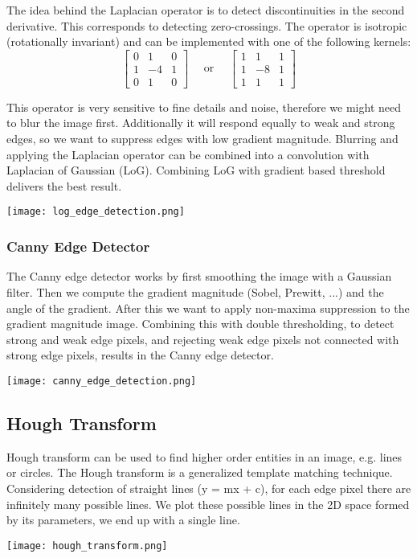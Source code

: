 The idea behind the Laplacian operator is to detect discontinuities in the second derivative. This corresponds to detecting zero-crossings. The operator is isotropic (rotationally invariant) and can be implemented with one of the following kernels:
$$
\begin{bmatrix}
    0 & 1 & 0\\
    1 & -4 & 1\\
    0 & 1 & 0
\end{bmatrix}
\quad
\text{ or }
\quad
\begin{bmatrix}
    1 & 1 & 1\\
    1 & -8 & 1\\
    1 & 1 & 1
\end{bmatrix}
$$

This operator is very sensitive to fine details and noise, therefore we might need to blur the image first. Additionally it will respond equally to weak and strong edges, so we want to suppress edges with low gradient magnitude. Blurring and applying the Laplacian operator can be combined into a convolution with Laplacian of Gaussian (LoG). Combining LoG with gradient based threshold delivers the best result.
\begin{center}
	\texttt{[image: log\_edge\_detection.png]}
\end{center}

\subsubsection{Canny Edge Detector}

The Canny edge detector works by first smoothing the image with a Gaussian filter. Then we compute the gradient magnitude (Sobel, Prewitt, ...) and the angle of the gradient. After this we want to apply non-maxima suppression to the gradient magnitude image. Combining this with double thresholding, to detect strong and weak edge pixels, and rejecting weak edge pixels not connected with strong edge pixels, results in the Canny edge detector.
\begin{center}
	\texttt{[image: canny\_edge\_detection.png]}
\end{center}


\subsection{Hough Transform}

Hough transform can be used to find higher order entities in an image, e.g. lines or circles. The Hough transform is a generalized template matching technique. Considering detection of straight lines (y = mx + c), for each edge pixel there are infinitely many possible lines. We plot these possible lines in the 2D space formed by its parameters, we end up with a single line.
\begin{center}
	\texttt{[image: hough\_transform.png]}
\end{center}

